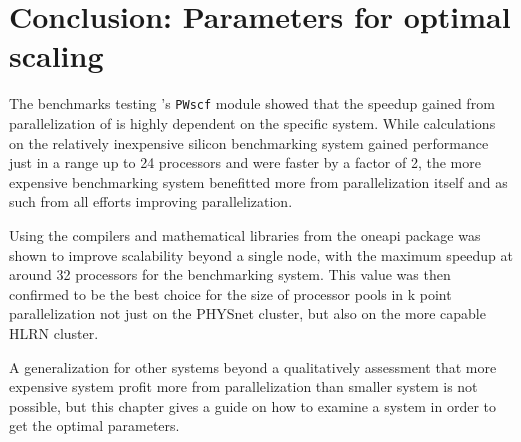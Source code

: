 \documentclass[main.tex]{subfiles}
\begin{document}
\section{Conclusion: Parameters for optimal scaling}

The benchmarks testing \QE 's \texttt{PWscf} module showed that the speedup gained from parallelization of is highly dependent on the specific system.
While calculations on the relatively inexpensive silicon benchmarking system gained performance just in a range up to 24 processors and were faster by a factor of 2, the more expensive \TaS benchmarking system benefitted more from parallelization itself and as such from all efforts improving parallelization.

Using the compilers and mathematical libraries from the \gls{oneapi} package was shown to improve scalability beyond a single node, with the maximum speedup at around 32 processors for the \TaS benchmarking system.
This value was then confirmed to be the best choice for the size of processor pools in k point parallelization not just on the PHYSnet cluster, but also on the more capable HLRN cluster.

A generalization for other systems beyond a qualitatively assessment that more expensive system profit more from parallelization than smaller system is not possible, but this chapter gives a guide on how to examine a system in order to get the optimal parameters.
\end{document}
